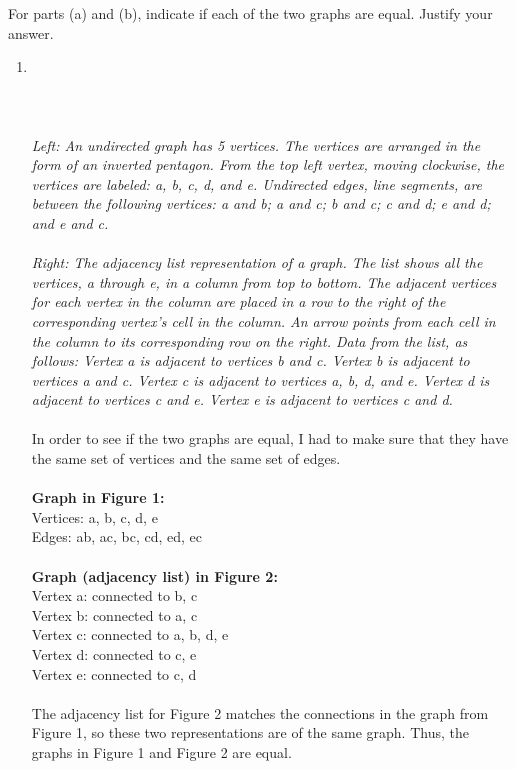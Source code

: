 \documentclass{amsart}
\theoremstyle{definition}
\theoremstyle{Exercise}
\theoremstyle{remark}
\theoremstyle{rule}
\numberwithin{equation}{section}
\begin{document}
For parts (a) and (b), indicate if each of the two graphs are equal. Justify your answer.\\
 \begin{enumerate}[label=(\alph*)]
 

  \item
\hfil
\\\\
\\\\
 {\color{blue}{\bf Figure 1:} \emph{Left: An undirected graph has 5 vertices. The vertices are arranged in the form of an inverted pentagon. From the top left vertex, moving clockwise, the vertices are labeled: a, b, c, d, and e. Undirected edges, line segments, are between the following vertices: a and b; a and c; b and c; c and d; e and d; and e and c. \\
 }
 }\\
{\color{blue}{\bf Figure 2:} \emph{
  Right: The adjacency list representation of a graph. The list shows all the vertices, a through e, in a column from top to bottom. The adjacent vertices for each vertex in the column are placed in a row to the right of the corresponding vertex’s cell in the column. An arrow points from each cell in the column to its corresponding row on the right. Data from the list, as follows: Vertex a is adjacent to vertices b and c. Vertex b is adjacent to vertices a and c. Vertex c is adjacent to vertices a, b, d, and e. Vertex d is adjacent to vertices c and e. Vertex e is adjacent to vertices c and d.
}
}
\\\\
In order to see if the two graphs are equal, I had to make sure that they have the same set of vertices and the same set of edges.\\\\
\textbf{Graph in Figure 1:}\\
Vertices: a, b, c, d, e\\
Edges: ab, ac, bc, cd, ed, ec\\\\
\textbf{Graph (adjacency list) in Figure 2:}\\
Vertex a: connected to b, c\\
Vertex b: connected to a, c\\
Vertex c: connected to a, b, d, e\\
Vertex d: connected to c, e\\
Vertex e: connected to c, d\\\\
The adjacency list for Figure 2 matches the connections in the graph from Figure 1, so these two representations are of the same graph. Thus, the graphs in Figure 1 and Figure 2 are equal.


\end{enumerate}
\end{document}
